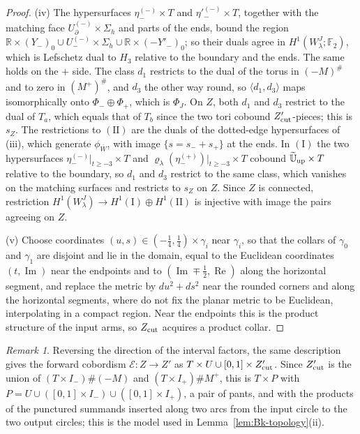 \documentclass[11pt]{amsart}
\theoremstyle{definition}
\theoremstyle{remark}
\newtheorem{remark}[theorem]{Remark}
\theoremstyle{plain}
\numberwithin{equation}{section}
\newcommand{\RR}{\mathbb{R}}
\newcommand{\FF}{\mathbb{F}_2}
\begin{document}
\begin{proof}
(iv) The hypersurfaces $\eta^{(-)}_-\times T$ and $\eta'^{(-)}_-\times T$, together with the
matching face $U^{(-)}_\partial\times\Sigma_h$ and parts of the ends, bound the region
$\RR\times(Y_-)_0\cup U^{(-)}_-\times\Sigma_h\cup\RR\times(-Y'_-)_0$; so their duals agree in
$H^1(W^J_\lambda;\FF)$, which is Lefschetz dual to $H_3$ relative to the boundary and
the ends. The same holds on the $+$ side. The class $d_1$ restricts to the dual
of the torus in $(-M)^\#$ and to zero in $(M^+)^\#$, and $d_3$ the other way round, so
$\langle d_1,d_3\rangle$ maps isomorphically onto $\Phi_-\oplus\Phi_+$, which is $\Phi_J$. On
$Z$, both $d_1$ and $d_3$ restrict to the dual of $T_a$, which equals that of $T_b$
since the two tori cobound $Z'_{\rm cut}$-pieces; this is $s_Z$. The restrictions to
$\mathrm{(II)}$ are the duals of the dotted-edge hypersurfaces of (iii), which generate
$\phi_{\overline W}$, with image $\{s=s_-+s_+\}$ at the ends. In $\mathrm{(I)}$ the two
hypersurfaces $\eta^{(-)}_-|_{t\ge-3}\times T$ and $\varrho_\lambda(\eta^{(+)}_-)|_{t\ge-3}\times T$
cobound $\widetilde{\mathbb U}_{\rm up}\times T$ relative to the boundary, so $d_1$ and $d_3$ restrict
to the same class, which vanishes on the matching surfaces and restricts to $s_Z$
on $Z$. Since $Z$ is connected, restriction
$H^1(W^J_\lambda)\to H^1(\mathrm{I})\oplus H^1(\mathrm{II})$ is injective with image the pairs agreeing on
$Z$.

(v) Choose coordinates $(u,s)\in(-\tfrac14,\tfrac14)\times\gamma_i$ near $\gamma_i$, so that the
collars of $\gamma_0$ and $\gamma_1$ are disjoint and lie in the domain, equal to the
Euclidean coordinates $(t,\operatorname{Im})$ near the endpoints and to
$(\operatorname{Im}\mp\tfrac12,\operatorname{Re})$ along the horizontal segment, and
replace the metric by $du^2+ds^2$ near the rounded corners and along the horizontal
segments, where \cite{DFL} do not fix the planar metric to be Euclidean,
interpolating in a compact region. Near the endpoints this is the product structure of the input
arms, so $Z_{\rm cut}$ acquires a product collar.
\end{proof}

\begin{remark}\label{rem:excision-models}
Reversing the direction of the interval factors, the same description gives the
forward cobordism $\mathcal E\colon Z\to Z'$ as $T\times U\cup[0,1]\times Z'_{\rm cut}$. Since
$Z'_{\rm cut}$ is the union of $(T\times I_-)\#(-M)$ and $(T\times I_+)\#M^+$, this is $T\times P$
with $P=U\cup([0,1]\times I_-)\cup([0,1]\times I_+)$, a pair of pants, and with the products of
the punctured summands inserted along two arcs from the input circle to the two
output circles; this is the model used in Lemma~\ref{lem:Bk-topology}(ii).
\end{remark}
\end{document}
